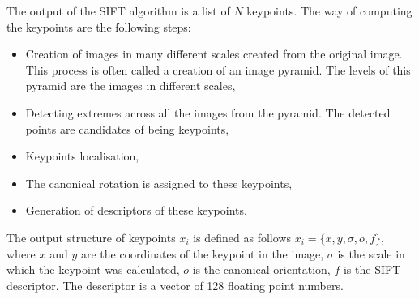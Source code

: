 \documentclass[thesis=B,english]{FITthesis}[2019/12/23]
\begin{document}
            The output of the SIFT algorithm is a list of \(N\) keypoints. The way of computing the keypoints are the following steps:
            \begin{itemize}
                \item Creation of images in many different scales created from the original image. This process is often called a creation of an image pyramid. The levels of this pyramid are the images in different scales,
                \item Detecting extremes across all the images from the pyramid. The detected points are candidates of being keypoints,
                \item Keypoints localisation,
                \item The canonical rotation is assigned to these keypoints,
                \item Generation of descriptors of these keypoints.
            \end{itemize}
            The output structure of keypoints \(x_i\) is defined as follows \(x_i = \{x,y,\sigma,o,f\}\), where \(x\) and \(y\) are the coordinates of the keypoint in the image, \(\sigma\) is the scale in which the keypoint was calculated, \(o\) is the canonical orientation, \(f\) is the SIFT descriptor. The descriptor is a vector of 128 floating point numbers.
\end{document}
